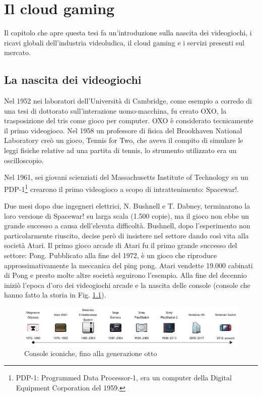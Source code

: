 %
%

\chapter{Il cloud gaming}
Il capitolo che apre questa tesi fa un'introduzione sulla nascita dei videogiochi, i ricavi globali dell'industria videoludica, il cloud gaming e i servizi presenti sul mercato.




\section{La nascita dei videogiochi}
Nel 1952 nei laboratori dell'Università di Cambridge, come esempio a corredo di una tesi di dottorato sull'interazione uomo-macchina, fu creato OXO, la trasposizione del tris come gioco per computer. OXO è considerato tecnicamente il primo videogioco. Nel 1958 un professore di fisica del Brookhaven National Laboratory creò un gioco, Tennis for Two, che aveva il compito di simulare le leggi fisiche relative ad una partita di tennis, lo strumento utilizzato era un oscilloscopio.

Nel 1961, sei giovani scienziati del Massachusetts Institute of Technology su un PDP-1\footnote{PDP-1: Programmed Data Processor-1, era un computer della Digital Equipment Corporation del 1959.} crearono il primo videogioco a scopo di intrattenimento: Spacewar!.

Due mesi dopo due ingegneri elettrici, N. Bushnell e T. Dabney, terminarono la loro versione di Spacewar! su larga scala (1.500 copie), ma il gioco non ebbe un grande successo a causa dell'elevata difficoltà. Bushnell, dopo l'esperimento non particolarmente riuscito, decise però di insistere nel settore dando così vita alla società Atari. Il primo gioco arcade di Atari fu il primo grande successo del settore: Pong. Pubblicato alla fine del 1972, è un gioco che riproduce approssimativamente la meccanica del ping pong. Atari vendette 19.000 cabinati di Pong e presto molte altre società seguirono l'esempio. Alla fine del decennio iniziò l'epoca d'oro dei videogiochi arcade e la nascita delle console (console che hanno fatto la storia in Fig. \ref{fig:consoles_history}).

\begin{figure}[H]
	\includegraphics[width=\linewidth]{immagini/consoles_history}
	\caption{Console iconiche, fino alla generazione otto}
	\label{fig:consoles_history}
\end{figure}

